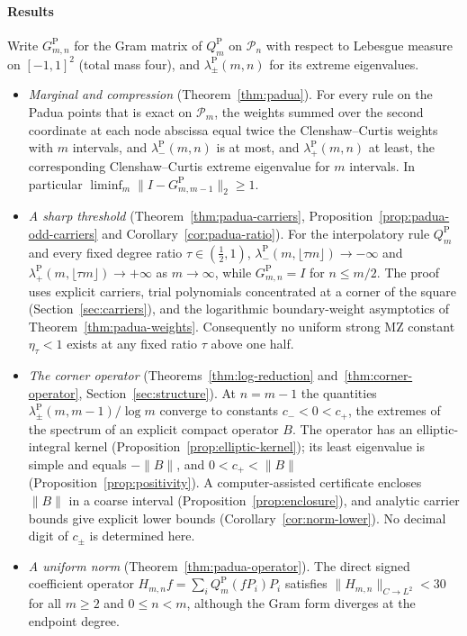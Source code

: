 \documentclass[preprint,12pt,a4paper]{elsarticle}
\theoremstyle{remark}
\newcommand{\Pa}{\mathrm P}
\begin{document}
\paragraph{Results}
Write $G^{\mathrm P}_{m,n}$ for the Gram matrix of $Q_m^{\mathrm P}$ on
$\mathcal P_n$ with respect to Lebesgue measure on $[-1,1]^2$ (total mass four),
and $\lambda^{\mathrm P}_\pm(m,n)$ for its extreme eigenvalues.
\begin{itemize}
\item[\textbf{A.}] \emph{Marginal and compression} (Theorem~\ref{thm:padua}).
 For every rule on the Padua points that is exact on $\mathcal P_m$, the weights
 summed over the second coordinate at each node abscissa equal twice the
 Clenshaw--Curtis weights with $m$ intervals, and $\lambda^{\mathrm P}_-(m,n)$ is
 at most, and $\lambda^{\mathrm P}_+(m,n)$ at least, the corresponding
 Clenshaw--Curtis extreme eigenvalue for $m$ intervals. In particular
 $\liminf_m\|I-G^{\mathrm P}_{m,m-1}\|_2\ge1$.
\item[\textbf{B.}] \emph{A sharp threshold} (Theorem~\ref{thm:padua-carriers},
 Proposition~\ref{prop:padua-odd-carriers} and
 Corollary~\ref{cor:padua-ratio}). For the interpolatory rule $Q^{\mathrm P}_m$
 and every fixed degree ratio $\tau\in(\tfrac12,1)$,
 $\lambda^\Pa_-(m,\lfloor\tau m\rfloor)\to-\infty$
 and $\lambda^\Pa_+(m,\lfloor\tau m\rfloor)\to+\infty$ as $m\to\infty$,
 while $G^{\mathrm P}_{m,n}=I$ for $n\le m/2$. The proof uses explicit
 carriers, trial polynomials concentrated at a corner of the square
 (Section~\ref{sec:carriers}), and the logarithmic boundary-weight asymptotics of
 Theorem~\ref{thm:padua-weights}. Consequently no uniform strong MZ constant
 $\eta_\tau<1$ exists at any fixed ratio $\tau$ above one half.
\item[\textbf{C.}] \emph{The corner operator} (Theorems~\ref{thm:log-reduction}
 and~\ref{thm:corner-operator}, Section~\ref{sec:structure}). At $n=m-1$
 the quantities $\lambda^{\mathrm P}_\pm(m,m-1)/\log m$ converge to
 constants $c_-<0<c_+$, the extremes of the spectrum of an explicit compact
 operator $B$. The operator has an elliptic-integral kernel
 (Proposition~\ref{prop:elliptic-kernel}); its least eigenvalue is simple and
 equals $-\|B\|$, and $0<c_+<\|B\|$ (Proposition~\ref{prop:positivity}). A
 computer-assisted certificate encloses $\|B\|$ in a coarse interval
 (Proposition~\ref{prop:enclosure}), and analytic carrier bounds give
 explicit lower bounds (Corollary~\ref{cor:norm-lower}). No decimal digit of $c_\pm$ is
 determined here.
\item[\textbf{D.}] \emph{A uniform norm} (Theorem~\ref{thm:padua-operator}). The direct signed
 coefficient operator $H_{m,n}f=\sum_iQ_m^{\mathrm P}(fP_i)P_i$ satisfies
 $\|H_{m,n}\|_{C\to L^2}<30$ for all $m\ge2$ and $0\le n<m$, although the
 Gram form diverges at the endpoint degree.
\end{itemize}
\end{document}
